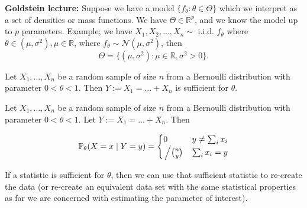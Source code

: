 \textbf{Goldstein lecture:} Suppose we have a model \(\{f_\theta: \theta \in \Theta\}\) which we interpret as a set of densities or mass functions. We have \(\Theta \in \mathbb{R}^p\), and we know the model up to \(p\) parameters. Example; we have \(X_1, X_2, \ldots, X_n \sim \) i.i.d. \(f_\theta\) where \(\theta \in (\mu, \sigma^2), \mu \in \mathbb{R}\), where \(f_\theta \sim \mathcal{N}(\mu, \sigma^2)\), 
then
\[
\Theta = \{ (\mu, \sigma^2): \mu \in \mathbb{R}, \sigma^2 > 0\}.
\]

\begin{example}\label{mathstats.541a.ex.5.2} Let \(X_1, \ldots, X_n\) be a random sample of size \(n\) from a Bernoulli distribution with parameter \(0 < \theta < 1\). Then \(Y:= X_1 = \ldots + X_n\) is sufficient for \(\theta\).

\end{example}

\begin{proposition}\label{mathstats.541a.ex.5.2} Let \(X_1, \ldots, X_n\) be a random sample of size \(n\) from a Bernoulli distribution with parameter \(0 < \theta < 1\). Let \(Y:= X_1 = \ldots + X_n\). Then

\[
\mathbb{P}_\theta(X=x \mid Y=y) = \begin{cases}
0 & y \neq \sum_i x_i \\
\left. \middle/ \binom{n}{y} \right. & \sum_i x_i = y
\end{cases}
\]

\end{proposition}

\begin{remark} If a statistic is sufficient for \(\theta\), then we can use that sufficient statistic to re-create the data (or re-create an equivalent data set with the same statistical properties as far we are concerned with estimating the parameter of interest).

\end{remark}

